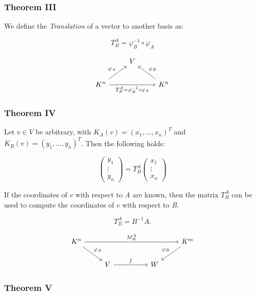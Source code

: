 \subsubsection{Theorem III} 

We define the \emph{Translation} of a vector to another basis as:

\[
    T_{B}^{A} = \varphi_{B}^{-1} \circ \varphi_A
\]

\[
    \begin{tikzcd}
    & V & \\
    K^n \arrow[ur, "\varphi_A"] \arrow[rr, "T_{B}^{A} = \varphi_B^{-1} \circ \varphi_A"'] & & K^n \arrow[ul, "\varphi_B"']
    \end{tikzcd}
\]

\subsubsection{Theorem IV} 

Let \( v \in V \) be arbitrary, with \( K_A(v) = {(x_1, \dots, x_n)}^T \) 
and \( K_B(v) = {(y_1, \dots, y_n)}^T \).  Then the following holds:

\[
    \begin{pmatrix}
    y_1 \\
    \vdots \\
    y_n
    \end{pmatrix}
    =
    T_B^A
    \begin{pmatrix}
    x_1 \\
    \vdots \\
    x_n
    \end{pmatrix}
\]

If the coordinates of \( v \) with respect to \emph{A} are known, then the matrix \( T_B^A \) can be used to compute the coordinates of \( v \) with respect to \emph{B}.

\[ 
    T_B^A = B^{-1}A. 
\]

\[
    \begin{tikzcd}
        K^n \arrow[rrrr, "M_{B}^{A}"] \arrow[rd, "\varphi_A"] &                   &  &   & K^m \arrow[ld, "\varphi_B"'] \\
                                                              & V \arrow[rr, "f"] &  & W &                             
        \end{tikzcd}
\]

\subsubsection{Theorem V}
 
